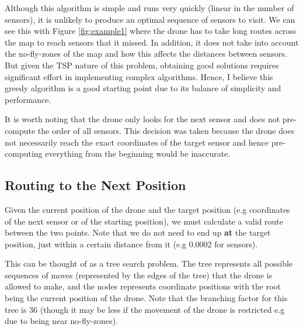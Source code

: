 \documentclass[11pt]{article}
\begin{document}
Although this algorithm is simple and runs very quickly (linear in the number of sensors), it is unlikely to produce an optimal sequence of sensors to visit. We can see this with Figure \ref{fig:example1} where the drone has to take long routes across the map to reach sensors that it missed. In addition, it does not take into account the no-fly-zones of the map and how this affects the distances between sensors. But given the TSP nature of this problem, obtaining good solutions requires significant effort in implementing complex algorithms. Hence, I believe this greedy algorithm is a good starting point due to its balance of simplicity and performance.

It is worth noting that the drone only looks for the next sensor and does not pre-compute the order of all sensors. This decision was taken because the drone does not necessarily reach the exact coordinates of the target sensor and hence pre-computing everything from the beginning would be inaccurate.



\subsection{Routing to the Next Position}
Given the current position of the drone and the target position (e.g coordinates of the next sensor or of the starting position), we must calculate a valid route between the two points. Note that we do not need to end up \textbf{at} the target position, just within a certain distance from it (e.g 0.0002 for sensors).

This can be thought of as a tree search problem. The tree represents all possible sequences of moves (represented by the edges of the tree) that the drone is allowed to make, and the nodes represents coordinate positions with the root being the current position of the drone. Note that the branching factor for this tree is 36 (though it may be less if the movement of the drone is restricted e.g due to being near no-fly-zones).
\end{document}

